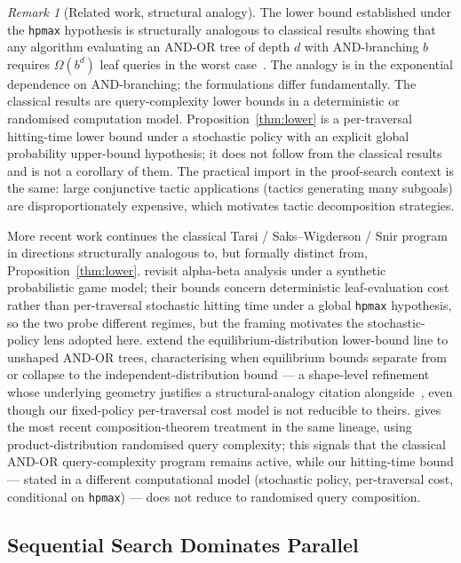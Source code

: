 \documentclass[reqno,11pt]{amsart}
\theoremstyle{plain}
\theoremstyle{definition}
\theoremstyle{remark}
\newtheorem{remark}[theorem]{Remark}
\begin{document}
\begin{remark}[Related work, structural analogy]
The lower bound established under the \texttt{hpmax} hypothesis is structurally analogous to classical results showing that any algorithm evaluating an AND-OR tree of depth $d$ with AND-branching $b$ requires $\Omega(b^d)$ leaf queries in the worst case~\citep{SaksWigderson1986,Snir1985}. The analogy is in the exponential dependence on AND-branching; the formulations differ fundamentally. The classical results are query-complexity lower bounds in a deterministic or randomised computation model. Proposition~\ref{thm:lower} is a per-traversal hitting-time lower bound under a stochastic policy with an explicit global probability upper-bound hypothesis; it does not follow from the classical results and is not a corollary of them. The practical import in the proof-search context is the same: large conjunctive tactic applications (tactics generating many subgoals) are disproportionately expensive, which motivates tactic decomposition strategies.

More recent work continues the classical Tarsi / Saks--Wigderson / Snir program in directions structurally analogous to, but formally distinct from, Proposition~\ref{thm:lower}. \citet{BoigeBoumazaScherrer2025} revisit alpha-beta analysis under a synthetic probabilistic game model; their bounds concern deterministic leaf-evaluation cost rather than per-traversal stochastic hitting time under a global \texttt{hpmax} hypothesis, so the two probe different regimes, but the framing motivates the stochastic-policy lens adopted here. \citet{ItoSuzuki2024} extend the equilibrium-distribution lower-bound line to unshaped AND-OR trees, characterising when equilibrium bounds separate from or collapse to the independent-distribution bound --- a shape-level refinement whose underlying geometry justifies a structural-analogy citation alongside~\citet{Tarsi1983,SaksWigderson1986}, even though our fixed-policy per-traversal cost model is not reducible to theirs. \citet{Sanyal2024} gives the most recent composition-theorem treatment in the same lineage, using product-distribution randomised query complexity; this signals that the classical AND-OR query-complexity program remains active, while our hitting-time bound --- stated in a different computational model (stochastic policy, per-traversal cost, conditional on \texttt{hpmax}) --- does not reduce to randomised query composition.
\end{remark}

\subsection{Sequential Search Dominates Parallel}
\end{document}
